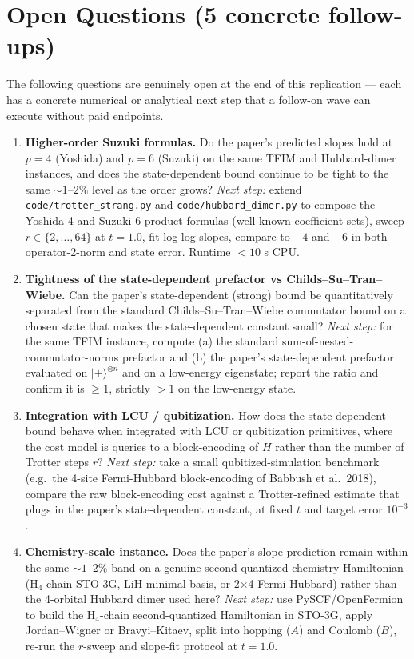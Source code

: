 \section{Open Questions (5 concrete follow-ups)}

The following questions are genuinely open at the end of this replication --- each has
a concrete numerical or analytical next step that a follow-on wave can execute without
paid endpoints.

\begin{enumerate}
  \item \textbf{Higher-order Suzuki formulas.}
  Do the paper's predicted slopes hold at $p=4$ (Yoshida) and $p=6$ (Suzuki) on the
  same TFIM and Hubbard-dimer instances, and does the state-dependent bound continue
  to be tight to the same $\sim 1$--$2\%$ level as the order grows?
  \emph{Next step:} extend \texttt{code/trotter\_strang.py} and \texttt{code/hubbard\_dimer.py}
  to compose the Yoshida-4 and Suzuki-6 product formulas (well-known coefficient sets),
  sweep $r \in \{2,\ldots,64\}$ at $t=1.0$, fit log-log slopes, compare to $-4$ and $-6$
  in both operator-2-norm and state error. Runtime $<10$ s CPU.

  \item \textbf{Tightness of the state-dependent prefactor vs Childs--Su--Tran--Wiebe.}
  Can the paper's state-dependent (strong) bound be quantitatively separated from the
  standard Childs--Su--Tran--Wiebe commutator bound on a chosen state that makes the
  state-dependent constant small?
  \emph{Next step:} for the same TFIM instance, compute (a) the standard sum-of-nested-commutator-norms
  prefactor and (b) the paper's state-dependent prefactor evaluated on $|+\rangle^{\otimes n}$
  and on a low-energy eigenstate; report the ratio and confirm it is $\ge 1$, strictly $>1$
  on the low-energy state.

  \item \textbf{Integration with LCU / qubitization.}
  How does the state-dependent bound behave when integrated with LCU or qubitization
  primitives, where the cost model is queries to a block-encoding of $H$ rather than the
  number of Trotter steps $r$?
  \emph{Next step:} take a small qubitized-simulation benchmark (e.g.\ the 4-site Fermi-Hubbard
  block-encoding of Babbush et al.\ 2018), compare the raw block-encoding cost against a
  Trotter-refined estimate that plugs in the paper's state-dependent constant, at fixed
  $t$ and target error $10^{-3}$.

  \item \textbf{Chemistry-scale instance.}
  Does the paper's slope prediction remain within the same $\sim 1$--$2\%$ band on a
  genuine second-quantized chemistry Hamiltonian (H$_4$ chain STO-3G, LiH minimal basis,
  or 2$\times$4 Fermi-Hubbard) rather than the 4-orbital Hubbard dimer used here?
  \emph{Next step:} use PySCF/OpenFermion to build the H$_4$-chain second-quantized
  Hamiltonian in STO-3G, apply Jordan--Wigner or Bravyi--Kitaev, split into hopping ($A$)
  and Coulomb ($B$), re-run the $r$-sweep and slope-fit protocol at $t=1.0$.


\end{enumerate}

